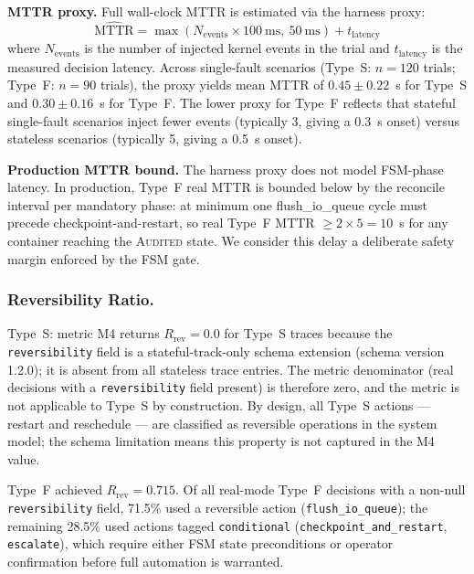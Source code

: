 \documentclass[runningheads]{llncs}
\begin{document}
\noindent\textbf{MTTR proxy.}  Full wall-clock MTTR is estimated via
the harness proxy:
\begin{equation}
  \widehat{\text{MTTR}} = \max(N_\text{events} \times 100~\text{ms},\
    50~\text{ms}) + t_\text{latency}
  \label{eq:mttr_proxy}
\end{equation}
where $N_\text{events}$ is the number of injected kernel events in the
trial and $t_\text{latency}$ is the measured decision latency.
Across single-fault scenarios (Type~S: $n=120$ trials; Type~F:
$n=90$ trials), the proxy yields mean MTTR of $0.45 \pm 0.22$~s for
Type~S and $0.30 \pm 0.16$~s for Type~F.  The lower proxy for Type~F
reflects that stateful single-fault scenarios inject fewer events
(typically 3, giving a 0.3~s onset) versus stateless scenarios
(typically 5, giving a 0.5~s onset).

\noindent\textbf{Production MTTR bound.}  The harness proxy does not
model FSM-phase latency.  In production, Type~F real MTTR is bounded
below by the reconcile interval per mandatory phase: at minimum one
flush\_io\_queue cycle must precede checkpoint-and-restart, so real
Type~F MTTR $\geq 2 \times 5 = 10$~s for any container reaching the
\textsc{Audited} state.  We consider this delay a deliberate safety
margin enforced by the FSM gate.

\subsubsection{Reversibility Ratio.}

Type~S: metric M4 returns $R_\text{rev} = 0.0$ for Type~S traces
because the \texttt{reversibility} field is a stateful-track-only
schema extension (schema version 1.2.0); it is absent from all
stateless trace entries.  The metric denominator (real decisions with
a \texttt{reversibility} field present) is therefore zero, and the
metric is not applicable to Type~S by construction.  By design,
all Type~S actions --- restart and reschedule --- are classified as
reversible operations in the system model; the schema limitation means
this property is not captured in the M4 value.

Type~F achieved $R_\text{rev} = 0.715$.  Of all real-mode
Type~F decisions with a non-null \texttt{reversibility} field, 71.5\%
used a reversible action (\texttt{flush\_io\_queue}); the remaining
28.5\% used actions tagged \texttt{conditional}
(\texttt{checkpoint\_and\_restart}, \texttt{escalate}), which require
either FSM state preconditions or operator confirmation before full
automation is warranted.
\end{document}
